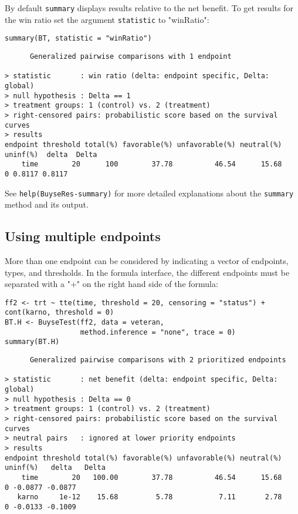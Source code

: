 \documentclass[12pt]{article}
\begin{document}
\clearpage

By default \texttt{summary} displays results relative to the net benefit. To
get results for the win ratio set the argument \texttt{statistic} to
"winRatio":
\lstset{language=r,label= ,caption= ,captionpos=b,numbers=none}
\begin{lstlisting}
summary(BT, statistic = "winRatio")
\end{lstlisting}

\begin{verbatim}
      Generalized pairwise comparisons with 1 endpoint

> statistic       : win ratio (delta: endpoint specific, Delta: global) 
> null hypothesis : Delta == 1 
> treatment groups: 1 (control) vs. 2 (treatment) 
> right-censored pairs: probabilistic score based on the survival curves
> results
endpoint threshold total(%) favorable(%) unfavorable(%) neutral(%) uninf(%)  delta  Delta
    time        20      100        37.78          46.54      15.68        0 0.8117 0.8117
\end{verbatim}

See \texttt{help(BuyseRes-summary)} for more detailed explanations about the
\texttt{summary} method and its output.

\subsection{Using multiple endpoints}
\label{sec:org99181b5}
More than one endpoint can be considered by indicating a vector of
endpoints, types, and thresholds. In the formula interface, the
different endpoints must be separated with a "+" on the right hand
side of the formula:
\lstset{language=r,label= ,caption= ,captionpos=b,numbers=none}
\begin{lstlisting}
ff2 <- trt ~ tte(time, threshold = 20, censoring = "status") + cont(karno, threshold = 0)
BT.H <- BuyseTest(ff2, data = veteran, 
				  method.inference = "none", trace = 0)
summary(BT.H)
\end{lstlisting}

\begin{verbatim}
      Generalized pairwise comparisons with 2 prioritized endpoints

> statistic       : net benefit (delta: endpoint specific, Delta: global) 
> null hypothesis : Delta == 0 
> treatment groups: 1 (control) vs. 2 (treatment) 
> right-censored pairs: probabilistic score based on the survival curves
> neutral pairs   : ignored at lower priority endpoints
> results
endpoint threshold total(%) favorable(%) unfavorable(%) neutral(%) uninf(%)   delta   Delta
    time        20   100.00        37.78          46.54      15.68        0 -0.0877 -0.0877
   karno     1e-12    15.68         5.78           7.11       2.78        0 -0.0133 -0.1009
\end{verbatim}
\end{document}

